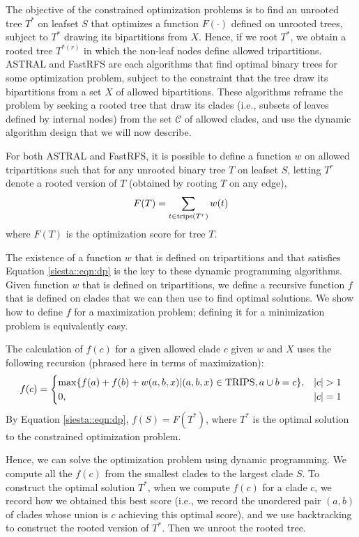 The objective of the constrained optimization problems is to find an unrooted tree $T^*$ on leafset $S$ that optimizes a function $F(\cdot)$ defined on unrooted trees, subject to $T^*$ drawing its bipartitions from $X$.
Hence, if we root $T^*$, we obtain a rooted tree $T^{*(r)}$ in which the non-leaf nodes define allowed tripartitions. 
ASTRAL and FastRFS are each algorithms that find optimal binary trees for some optimization problem,   subject to the constraint that the tree draw its bipartitions from a set $X$ of allowed bipartitions. 
These algorithms reframe the problem by seeking a rooted tree that draw its clades (i.e., subsets of leaves defined by internal nodes) from the set $\mathcal{C}$ of allowed clades, and use the dynamic algorithm design that we will now describe.

For both ASTRAL and FastRFS, it is possible to define a function $w$ on allowed tripartitions such that for any unrooted binary tree $T$ on leafset $S$, letting $T^{r}$ denote a rooted version of $T$ (obtained by rooting $T$ on any edge), 
\begin{equation}
\label{siesta::eqn:dp}
F(T) = \sum_{t \in \mathop{\rm trips}(T^{r}) } w(t)
\end{equation}
where $F(T)$ is the optimization score for tree $T$.

The existence of a function $w$ that is defined on tripartitions and that satisfies Equation \ref{siesta::eqn:dp} is the key to these dynamic programming algorithms.
Given function $w$ that is defined on tripartitions, we define a recursive function $f$ that is defined on clades that we can then use to find optimal solutions. 
We show how to define $f$ for  a maximization problem; defining it for a minimization problem is equivalently easy.


The calculation of $f(c)$ for a given allowed clade $c$ given $w$ and $X$ uses the following recursion (phrased here in terms of maximization): 
\begin{equation}
f(c) = 
\begin{cases}
\max \{ f(a) + f (b) + w(a,b,x)  | (a,b,x) \in \mathop{\rm TRIPS}, a \cup b = c\},  & |c|>1 
\\
 0, & |c|=1
\end{cases}
\end{equation}
By Equation \ref{siesta::eqn:dp}, $f(S) = F(T^*)$, where $T^*$ is the optimal solution to the constrained optimization problem.

Hence, we can solve the optimization problem using dynamic programming.
We compute all the $f(c)$ from the smallest clades to the largest clade $S$. 
To construct the optimal solution $T^*$,  when we compute $f(c)$ for a clade $c$, we record how we obtained this best score (i.e., we record the unordered pair $(a,b)$ of clades whose union is $c$ achieving this optimal score), and we use backtracking to construct the rooted version of $T^*$.
Then we unroot the rooted tree.

